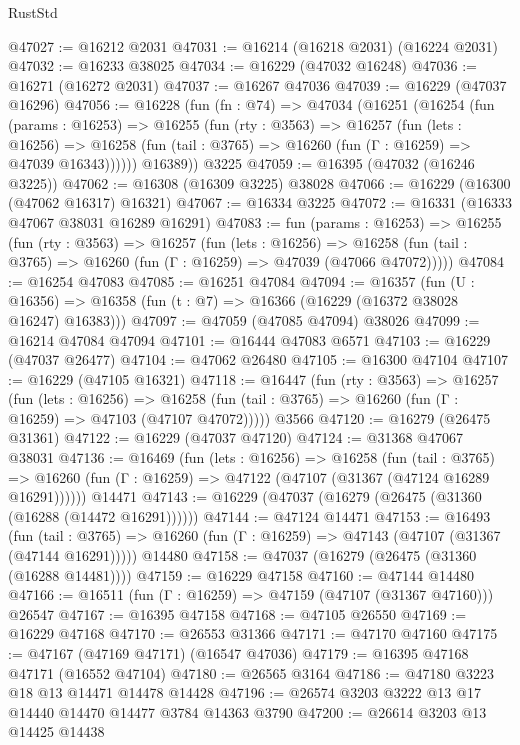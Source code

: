 \begin{lexlean}{RustStd}
\begin{coremodule}
@47027 := @16212 @2031
@47031 := @16214 (@16218 @2031) (@16224 @2031)
@47032 := @16233 @38025
@47034 := @16229 (@47032 @16248)
@47036 := @16271 (@16272 @2031)
@47037 := @16267 @47036
@47039 := @16229 (@47037 @16296)
@47056 := @16228
    (fun (fn : @74) =>
    @47034
      (@16251
        (@16254
          (fun (params : @16253) =>
          @16255
            (fun (rty : @3563) =>
            @16257
              (fun (lets : @16256) =>
              @16258 (fun (tail : @3765) => @16260 (fun (Γ : @16259) => @47039 @16343))))))
        @16389))
    @3225
@47059 := @16395 (@47032 (@16246 @3225))
@47062 := @16308 (@16309 @3225) @38028
@47066 := @16229 (@16300 (@47062 @16317) @16321)
@47067 := @16334 @3225
@47072 := @16331 (@16333 @47067 @38031 @16289 @16291)
@47083 := fun (params : @16253) =>
  @16255
    (fun (rty : @3563) =>
    @16257
      (fun (lets : @16256) =>
      @16258 (fun (tail : @3765) => @16260 (fun (Γ : @16259) => @47039 (@47066 @47072)))))
@47084 := @16254 @47083
@47085 := @16251 @47084
@47094 := @16357
    (fun (U : @16356) => @16358 (fun (t : @7) => @16366 (@16229 (@16372 @38028 @16247) @16383)))
@47097 := @47059 (@47085 @47094) @38026
@47099 := @16214 @47084 @47094
@47101 := @16444 @47083 @6571
@47103 := @16229 (@47037 @26477)
@47104 := @47062 @26480
@47105 := @16300 @47104
@47107 := @16229 (@47105 @16321)
@47118 := @16447
    (fun (rty : @3563) =>
    @16257
      (fun (lets : @16256) =>
      @16258 (fun (tail : @3765) => @16260 (fun (Γ : @16259) => @47103 (@47107 @47072)))))
    @3566
@47120 := @16279 (@26475 @31361)
@47122 := @16229 (@47037 @47120)
@47124 := @31368 @47067 @38031
@47136 := @16469
    (fun (lets : @16256) =>
    @16258
      (fun (tail : @3765) =>
      @16260 (fun (Γ : @16259) => @47122 (@47107 (@31367 (@47124 @16289 @16291))))))
    @14471
@47143 := @16229 (@47037 (@16279 (@26475 (@31360 (@16288 (@14472 @16291))))))
@47144 := @47124 @14471
@47153 := @16493
    (fun (tail : @3765) => @16260 (fun (Γ : @16259) => @47143 (@47107 (@31367 (@47144 @16291)))))
    @14480
@47158 := @47037 (@16279 (@26475 (@31360 (@16288 @14481))))
@47159 := @16229 @47158
@47160 := @47144 @14480
@47166 := @16511 (fun (Γ : @16259) => @47159 (@47107 (@31367 @47160))) @26547
@47167 := @16395 @47158
@47168 := @47105 @26550
@47169 := @16229 @47168
@47170 := @26553 @31366
@47171 := @47170 @47160
@47175 := @47167 (@47169 @47171) (@16547 @47036)
@47179 := @16395 @47168 @47171 (@16552 @47104)
@47180 := @26565 @3164
@47186 := @47180 @3223 @18 @13 @14471 @14478 @14428
@47196 := @26574 @3203 @3222 @13 @17 @14440 @14470 @14477 @3784 @14363 @3790
@47200 := @26614 @3203 @13 @14425 @14438

\end{coremodule}
\end{lexlean}
